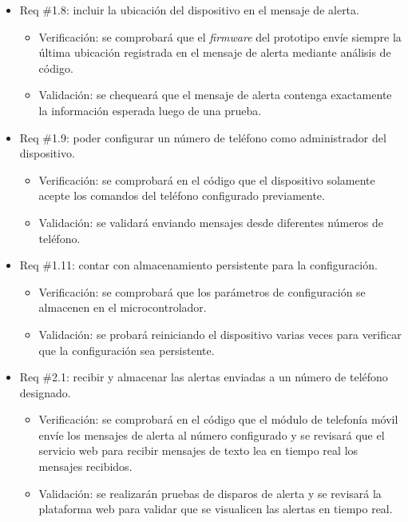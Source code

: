 \documentclass[
11pt, %
]{charter}
\begin{document}
\begin{itemize}
\item Req \#1.8: incluir la ubicación del dispositivo en el mensaje de alerta.

\begin{itemize}
	\item Verificación: se comprobará que el \textit{firmware} del prototipo envíe siempre la última ubicación registrada en el mensaje de alerta mediante análisis de código.
	\item Validación: se chequeará que el mensaje de alerta contenga exactamente la información esperada luego de una prueba.
\end{itemize}

\item Req \#1.9: poder configurar un número de teléfono como administrador del dispositivo.

\begin{itemize}
	\item Verificación: se comprobará en el código que el dispositivo solamente acepte los comandos del teléfono configurado previamente.
	\item Validación: se validará enviando mensajes desde diferentes números de teléfono.
\end{itemize}

\item Req \#1.11: contar con almacenamiento persistente para la configuración.

\begin{itemize}
	\item Verificación: se comprobará que los parámetros de configuración se almacenen en el microcontrolador.
	\item Validación: se probará reiniciando el dispositivo varias veces para verificar que la configuración sea persistente.
\end{itemize}

\item Req \#2.1: recibir y almacenar las alertas enviadas a un número de teléfono designado.

\begin{itemize}
	\item Verificación: se comprobará en el código que el módulo de telefonía móvil envíe los mensajes de alerta al número configurado y se revisará que el servicio web para recibir mensajes de texto lea en tiempo real los mensajes recibidos.
	\item Validación: se realizarán pruebas de disparos de alerta y se revisará la plataforma web para validar que se visualicen las alertas en tiempo real.
\end{itemize}

\end{itemize}
\end{document}
